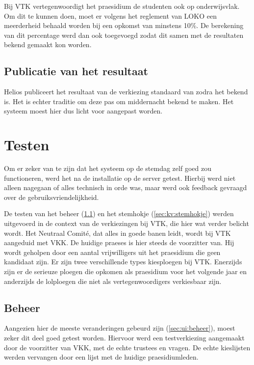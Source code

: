 Bij VTK vertegenwoordigt het praesidium de studenten ook op onderwijsvlak. Om dit te kunnen doen, moet er volgens het reglement van LOKO een meerderheid behaald worden bij een opkomst van minstens 10\%.\cite{loko_kiesreglement_verkiezingen} De berekening van dit percentage werd dan ook toegevoegd zodat dit samen met de resultaten bekend gemaakt kon worden.

\subsection{Publicatie van het resultaat}

Helios publiceert het resultaat van de verkiezing standaard van zodra het bekend is. Het is echter traditie om deze pas om middernacht bekend te maken. Het systeem moest hier dus licht voor aangepast worden.

\section{Testen}
\label{sec:kv:testen}

Om er zeker van te zijn dat het systeem op de stemdag zelf goed zou functioneren, werd het na de installatie op de server getest. Hierbij werd niet alleen nagegaan of alles technisch in orde was, maar werd ook feedback gevraagd over de gebruiksvriendelijkheid. 

\npar De testen van het beheer (\ref{sec:kv:beheer}) en het stemhokje (\ref{sec:kv:stemhokje}) werden uitgevoerd in de context van de verkiezingen bij VTK, die hier wat verder belicht wordt. Het Neutraal Comit\'e, dat alles in goede banen leidt, wordt bij VTK aangeduid met VKK. De huidige praeses is hier steeds de voorzitter van. Hij wordt geholpen door een aantal vrijwilligers uit het praesidium die geen kandidaat zijn. Er zijn twee verschillende types kiesploegen bij VTK. Enerzijds zijn er de serieuze ploegen die opkomen als praesidium voor het volgende jaar en anderzijds de lolploegen die niet als vertegenwoordigers verkiesbaar zijn.

\subsection{Beheer}
\label{sec:kv:beheer}

Aangezien hier de meeste veranderingen gebeurd zijn (\ref{sec:ui:beheer}), moest zeker dit deel goed getest worden. Hiervoor werd een testverkiezing aangemaakt door de voorzitter van VKK, met de echte trustees en vragen. De echte kieslijsten werden vervangen door een lijst met de huidige praesidiumleden.

